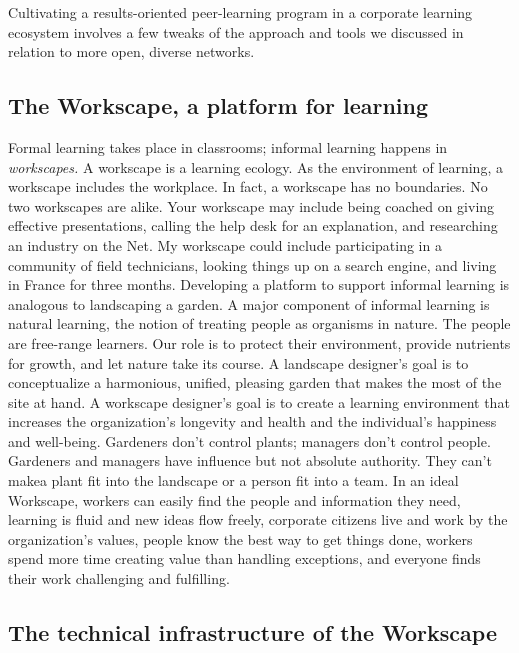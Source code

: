 
Cultivating a results-oriented peer-learning program in a corporate
learning ecosystem involves a few tweaks of the approach and tools we
discussed in relation to more open, diverse networks.

\subsection{The Workscape, a platform for learning}

Formal learning takes place in classrooms; informal learning happens in
\emph{workscapes.} A workscape is a learning ecology. As the environment
of learning, a workscape includes the workplace. In fact, a workscape
has no boundaries. No two workscapes are alike. Your workscape may
include being coached on giving effective presentations, calling the
help desk for an explanation, and researching an industry on the Net. My
workscape could include participating in a community of field
technicians, looking things up on a search engine, and living in France
for three months. Developing a platform to support informal learning is
analogous to landscaping a garden. A major component of informal
learning is natural learning, the notion of treating people as organisms
in nature. The people are free-range learners. Our role is to protect
their environment, provide nutrients for growth, and let nature take its
course. A landscape designer's goal is to conceptualize a harmonious,
unified, pleasing garden that makes the most of the site at hand. A
workscape designer's goal is to create a learning environment that
increases the organization's longevity and health and the individual's
happiness and well-being. Gardeners don't control plants; managers don't
control people. Gardeners and managers have influence but not absolute
authority. They can't makea plant fit into the landscape or a person fit
into a team. In an ideal Workscape, workers can easily find the people
and information they need, learning is fluid and new ideas flow freely,
corporate citizens live and work by the organization's values, people
know the best way to get things done, workers spend more time creating
value than handling exceptions, and everyone finds their work
challenging and fulfilling.

\subsection{The technical infrastructure of the Workscape}

